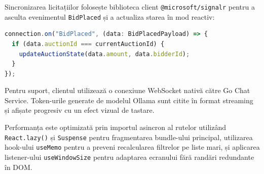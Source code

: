Sincronizarea licitațiilor folosește biblioteca client \texttt{@microsoft/signalr} pentru a asculta evenimentul \texttt{BidPlaced} și a actualiza starea în mod reactiv:
\begin{lstlisting}[language=TypeScript]
connection.on("BidPlaced", (data: BidPlacedPayload) => {
  if (data.auctionId === currentAuctionId) {
    updateAuctionState(data.amount, data.bidderId);
  }
});
\end{lstlisting}

Pentru suport, clientul utilizează o conexiune WebSocket nativă către Go Chat Service. Token-urile generate de modelul Ollama sunt citite în format streaming și afișate progresiv cu un efect vizual de tastare.

Performanța este optimizată prin importul asincron al rutelor utilizând \texttt{React.lazy()} și \texttt{Suspense} pentru fragmentarea bundle-ului principal, utilizarea hook-ului \texttt{useMemo} pentru a preveni recalcularea filtrelor pe liste mari, și aplicarea listener-ului \texttt{useWindowSize} pentru adaptarea ecranului fără randări redundante în DOM.
